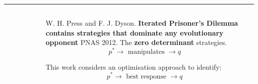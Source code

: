 \documentclass[usenames,dvipsnames,t]{beamer}
\newcommand{\R}{\mathbb{R}}
\begin{document}
\hrule height 3pt
\vspace{1cm}

\begin{columns}
    \begin{column}{.02\linewidth}
    \end{column}
    \begin{column}{.2\linewidth}
        \vspace{1cm}

        
    \end{column}
    \begin{column}{.3\linewidth}
    \vspace{-.5cm}
        \begin{center}
             \\
             \\
            
        \end{center}
    \end{column}
    \begin{column}{.1\linewidth}
        \vspace{2cm}

        
    \end{column}
    \begin{column}{.3\linewidth}
        \vspace{1cm}

        \small{
            W. H. Press and F. J. Dyson. \textbf{Iterated Prisoner's
            Dilemma contains strategies that dominate any evolutionary opponent}
            PNAS 2012. The \textbf{zero determinant} strategies.
            \[p ^ * \rightarrow \text{ manipulates } \rightarrow q\]
        }
        \vspace{1cm}

        \small{
        This work considers an optimisation approach to identify:
        \[ p ^ * \rightarrow \text{ best response } \rightarrow q\]}
        \normalsize{{
            \boldmath{\[u_q(p)= \frac{\frac{1}{2}\enspace p  Q  p^T + c^T p + a}
                  {\frac{1}{2}\enspace  p  \bar{Q}  p^T + \bar{c}^T  p + \bar{a}},\] \\
                  \[\text{where }  \ p \in \R^4_{[0, 1]}\]
            }}}
    \end{column}
    \begin{column}{.05\linewidth}
    \end{column}
\end{columns}
\vspace{1cm}
\end{document}
